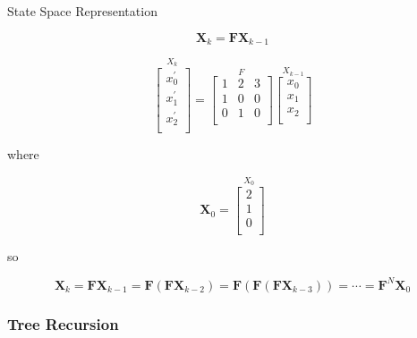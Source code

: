 State Space Representation
\newline

\begin{equation}
\mathbf{X}_k = \mathbf{F}\mathbf{X}_{k-1}
\label{eq:ss_rep}
\end{equation}

\begin{equation}
\stackrel{\mbox{$X_k$}}{
\left[ \begin{array}{c}
x^{'}_{0} \\
x^{'}_{1} \\
x^{'}_{2} \\
\end{array} \right]
}
= 
\stackrel{\mbox{$F$}}{
\left[ \begin{array}{ccc}
1 & 2 & 3 \\
1 & 0 & 0 \\
0 & 1 & 0 \\
\end{array} \right]
}
\stackrel{\mbox{$X_{k-1}$}}{
\left[ \begin{array}{c}
x_{0} \\
x_{1} \\
x_{2} \\
\end{array} \right]
}
\label{eq:ss_rep_2}
\end{equation}

where

\begin{equation}
\mathbf{X}_0 = 
\stackrel{\mbox{$X_{0}$}}{
\left[ \begin{array}{c}
2 \\
1 \\
0 \\
\end{array} \right]
}
\label{eq:ss_x0}
\end{equation}

so

\begin{equation}
\mathbf{X}_k 
= \mathbf{F}\mathbf{X}_{k-1}
= \mathbf{F} \left( \mathbf{F}\mathbf{X}_{k-2} \right)
= \mathbf{F} \left( \mathbf{F} \left( \mathbf{F}\mathbf{X}_{k-3} \right) \right)
= \cdots
= \mathbf{F}^N \mathbf{X}_0
\label{eq:ss_rep_expanded}
\end{equation}

            \subsubsection{Tree Recursion}
